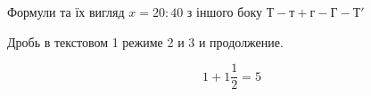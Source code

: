 \documentclass{kapital}
\begin{document}
   Формули та їх вигляд $x = 20 : 40 $ з іншого боку $Т - т + г - Г - Т'$

   Дробь в текстовом 1 режиме 2 и 3 и продолжение.

   \[
   	1 + 1\frac{1}{2}=5
   \]
\end{document}
